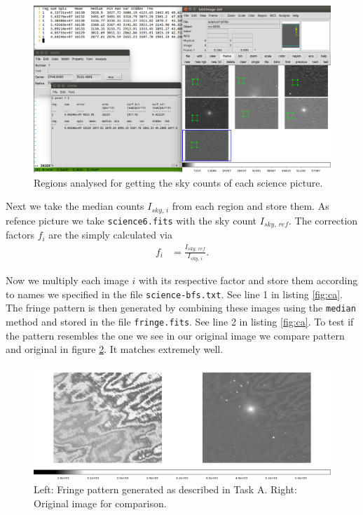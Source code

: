 \documentclass[11pt,a4paper,twoside]{article}
\begin{document}
\begin{figure}[h!]
\centering
\includegraphics[width=\linewidth]{../pic/regions}
\caption{Regions analysed for getting the sky counts of each science picture.}
\label{fig:reg}
\end{figure}

Next we take the median counts $I_{sky,\,i}$ from each region and store them.
As refence picture we take \verb+science6.fits+ with the sky count $I_{sky,\,ref}$.
The correction factors $f_i$ are the simply calculated via
\begin{align}
    f_i &= \frac{I_{sky,\,ref}}{I_{sky,\,i}} .
\end{align}

Now we multiply each image $i$ with its respective factor and store them
according to names we specified in the file \verb+science-bfs.txt+.
See line 1 in listing \ref{fig:ca}. The fringe pattern is then generated
by combining these images using the \verb+median+ method and stored in the
file \verb+fringe.fits+. See line 2 in listing \ref{fig:ca}. To test if the
pattern resembles the one we see in our original image we compare pattern
and original in figure \ref{fig:fr}. It matches extremely well.

\begin{figure}[h!]
\centering
\includegraphics[width=\linewidth]{../pic/fringes}

\caption{Left: Fringe pattern generated as described in Task A. Right:
         Original image for comparison.}
\label{fig:fr}
\end{figure}
\end{document}
